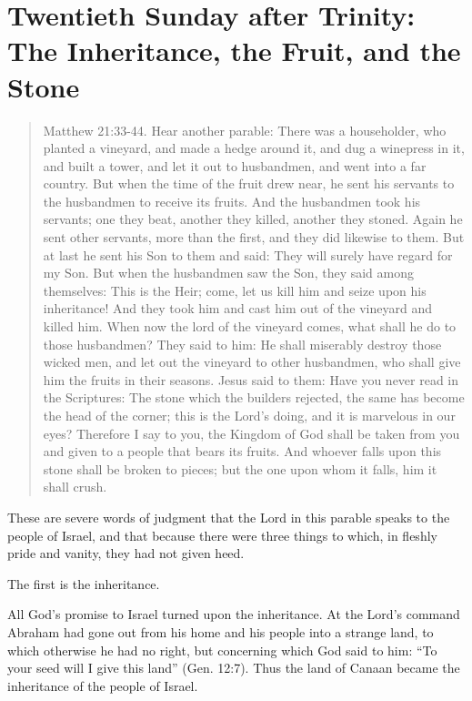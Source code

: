 
\section{Twentieth Sunday after Trinity: The Inheritance, the Fruit, and the Stone}

\begin{quote}

Matthew 21:33-44. Hear another parable: There was a householder, who planted a vineyard, and made a hedge around it, and dug a winepress in it, and built a tower, and let it out to husbandmen, and went into a far country. But when the time of the fruit drew near, he sent his servants to the husbandmen to receive its fruits. And the husbandmen took his servants; one they beat, another they killed, another they stoned. Again he sent other servants, more than the first, and they did likewise to them. But at last he sent his Son to them and said: They will surely have regard for my Son. But when the husbandmen saw the Son, they said among themselves: This is the Heir; come, let us kill him and seize upon his inheritance! And they took him and cast him out of the vineyard and killed him. When now the lord of the vineyard comes, what shall he do to those husbandmen? They said to him: He shall miserably destroy those wicked men, and let out the vineyard to other husbandmen, who shall give him the fruits in their seasons. Jesus said to them: Have you never read in the Scriptures: The stone which the builders rejected, the same has become the head of the corner; this is the Lord’s doing, and it is marvelous in our eyes? Therefore I say to you, the Kingdom of God shall be taken from you and given to a people that bears its fruits. And whoever falls upon this stone shall be broken to pieces; but the one upon whom it falls, him it shall crush.

\end{quote}

\bigskip

These are severe words of judgment that the Lord in this parable speaks to the people of Israel, and that because there were three things to which, in fleshly pride and vanity, they had not given heed.

The first is the inheritance.

All God’s promise to Israel turned upon the inheritance. At the Lord’s command Abraham had gone out from his home and his people into a strange land, to which otherwise he had no right, but concerning which God said to him: “To your seed will I give this land” (Gen. 12:7). Thus the land of Canaan became the inheritance of the people of Israel.


